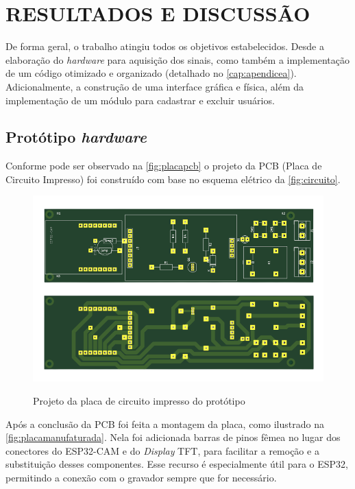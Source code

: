 
\chapter{RESULTADOS E DISCUSSÃO}\label{cap:resultados}

De forma geral, o trabalho atingiu todos os objetivos estabelecidos. 
Desde a elaboração do \textit{hardware} para aquisição dos 
sinais, como também a implementação de um código otimizado e organizado (detalhado no 
\autoref{cap:apendicea}). Adicionalmente, 
a construção de uma interface gráfica e física, além da 
implementação de um módulo para cadastrar e excluir usuários.

\section{Protótipo \textit{hardware}}\label{sec:contrucaoprototipo}

Conforme pode ser observado na \autoref{fig:placapcb} 
o projeto da PCB (Placa de Circuito Impresso) foi construído 
com base no esquema elétrico da \autoref{fig:circuito}. 

\begin{figure}[h!]
    \centering
    \caption{Projeto da placa de circuito impresso do protótipo}
    \includegraphics[scale=0.22]{figuras/placa_pcb.png}
    \fonte{}%
    \label{fig:placapcb}
    \centering
\end{figure}

Após a conclusão da PCB foi feita a montagem 
da placa, como ilustrado na \autoref{fig:placamanufaturada}. 
Nela foi adicionada barras de pinos fêmea no lugar dos 
conectores do ESP32-CAM e do \textit{Display} TFT, para facilitar 
a remoção e a substituição desses componentes. Esse recurso 
é especialmente útil para o ESP32, permitindo a conexão com o 
gravador sempre que for necessário.

